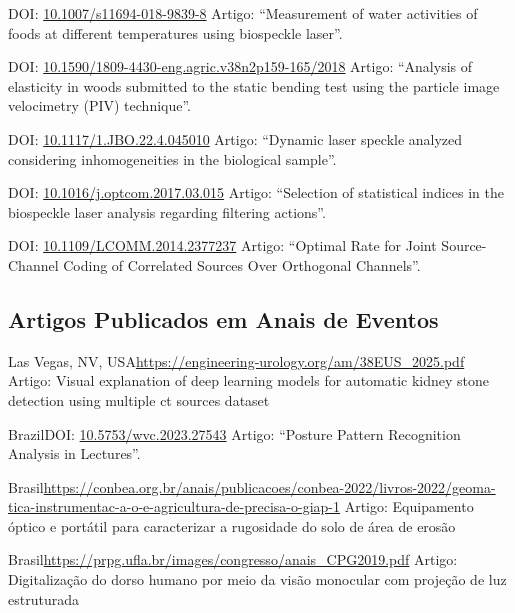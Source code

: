 \documentclass[11pt,a4paper,sans]{moderncv} %
\newcommand{\doiurl}[1]{\href{https://doi.org/#1}{#1}}
\begin{document}
	      {DOI: \doiurl{10.1007/s11694-018-9839-8}}{}{}
	      {Artigo: ``Measurement of water activities of foods at different temperatures using biospeckle laser''.}

	      {DOI: \doiurl{10.1590/1809-4430-eng.agric.v38n2p159-165/2018}}{}{}
	      {Artigo: ``Analysis of elasticity in woods submitted to the static bending test using the particle image velocimetry (PIV) technique''.}

	      {DOI: \doiurl{10.1117/1.JBO.22.4.045010}}{}{}
	      {Artigo: ``Dynamic laser speckle analyzed considering inhomogeneities in the biological sample''.}
	      
	      {DOI: \doiurl{10.1016/j.optcom.2017.03.015}}{}{}
	      {Artigo: ``Selection of statistical indices in the biospeckle laser analysis regarding filtering actions''.}
	      
	      {DOI: \doiurl{10.1109/LCOMM.2014.2377237}}{}{}
	      {Artigo: ``Optimal  Rate for Joint Source-Channel Coding of Correlated Sources Over Orthogonal Channels''.}

\subsection{Artigos Publicados em Anais de Eventos}

	      {Las Vegas, NV, USA}{}{\url{https://engineering-urology.org/am/38EUS_2025.pdf}}
	      {Artigo: Visual explanation of deep learning models for automatic
kidney stone detection using multiple ct sources dataset}

	      {Brazil}{}{DOI: \doiurl{10.5753/wvc.2023.27543} }
	      {Artigo: ``Posture Pattern Recognition Analysis in Lectures''.}
   
	      {Brasil}{}{\url{https://conbea.org.br/anais/publicacoes/conbea-2022/livros-2022/geoma-tica-instrumentac-a-o-e-agricultura-de-precisa-o-giap-1}}
	      {Artigo: Equipamento óptico e portátil para caracterizar a rugosidade do solo de área de erosão}
	      
	       
	      {Brasil}{}{\url{https://prpg.ufla.br/images/congresso/anais_CPG2019.pdf}}
	      {Artigo: Digitalização do dorso humano por meio da visão monocular com projeção de luz estruturada}
\end{document}
